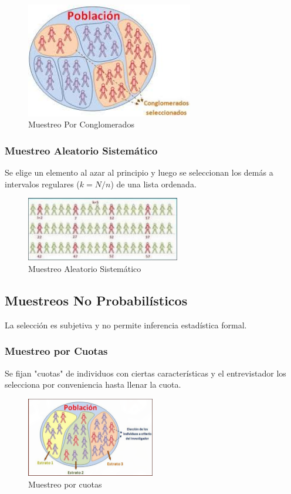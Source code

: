 \documentclass[12pt, letterpaper]{article}
\begin{document}
\begin{figure}[htbp]
	\centering
	\includegraphics[width=0.65\textwidth]{MPC}
	\caption{Muestreo Por Conglomerados}
	\label{fig:MPC}
\end{figure}


\subsubsection{Muestreo Aleatorio Sistemático}
Se elige un elemento al azar al principio y luego se seleccionan los demás a intervalos regulares ($k=N/n$) de una lista ordenada.

\begin{figure}[htbp]
	\centering
	\includegraphics[width=0.6\textwidth]{MASIS}
	\caption{Muestreo Aleatorio Sistemático}
	\label{fig:MASIS}
\end{figure}
\newpage

\subsection{Muestreos No Probabilísticos}
La selección es subjetiva y no permite inferencia estadística formal.

\subsubsection{Muestreo por Cuotas}
Se fijan "cuotas" de individuos con ciertas características y el entrevistador los selecciona por conveniencia hasta llenar la cuota.

\begin{figure}[htbp]
	\centering
	\includegraphics[width=0.5\textwidth]{MPCU}
	\caption{Muestreo por cuotas}
	\label{fig:MPCU}
\end{figure}
\end{document}
